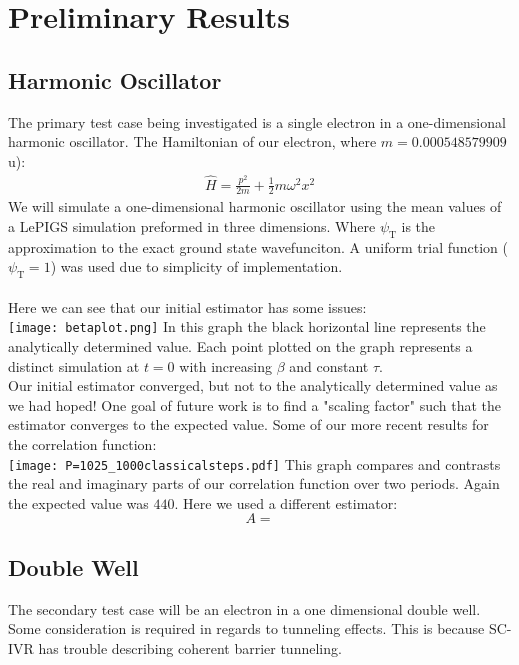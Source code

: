 \documentclass[12pt,letterpaper,oneside,final,titlepage]{article}               %
\numberwithin{equation}{section} %
\newcommand{\psiT}{\psi_{\textrm{T}}}
\begin{document}
\section{Preliminary Results}

\subsection*{Harmonic Oscillator}
The primary test case being investigated is a single electron in a one-dimensional harmonic oscillator. 
The Hamiltonian of our electron, where $m = \num{0.000548579909}$u): 
\begin{align}
    \hat{H} = \frac{p^2}{2m} + \frac{1}{2} m \omega^{2} x^{2} 
\end{align}
We will simulate a one-dimensional harmonic oscillator using the mean values of a LePIGS simulation preformed in three dimensions. 
Where $\psiT$ is the approximation to the exact ground state wavefunciton. 
A uniform trial function ($\psiT = 1$) was used due to simplicity of implementation. \\ \\
Here we can see that our initial estimator has some issues:\\
\texttt{[image: betaplot.png]}
In this graph the black horizontal line represents the analytically determined value.
Each point plotted on the graph represents a distinct simulation at $t=0$ with increasing $\beta$ and constant $\tau$.\\
Our initial estimator converged, but not to the analytically determined value as we had hoped! 
One goal of future work is to find a "scaling factor" such that the estimator converges to the expected value.
Some of our more recent results for the correlation function:\\
\texttt{[image: P=1025\_1000classicalsteps.pdf]}
This graph compares and contrasts the real and imaginary parts of our correlation function over two periods. 
Again the expected value was $440$.
Here we used a different estimator:
\begin{equation}
    A = 
\end{equation}


\subsection*{Double Well}
The secondary test case will be an electron in a one dimensional double well. 
Some consideration is required in regards to tunneling effects. 
This is because SC-IVR has trouble describing coherent barrier tunneling.
\end{document}
